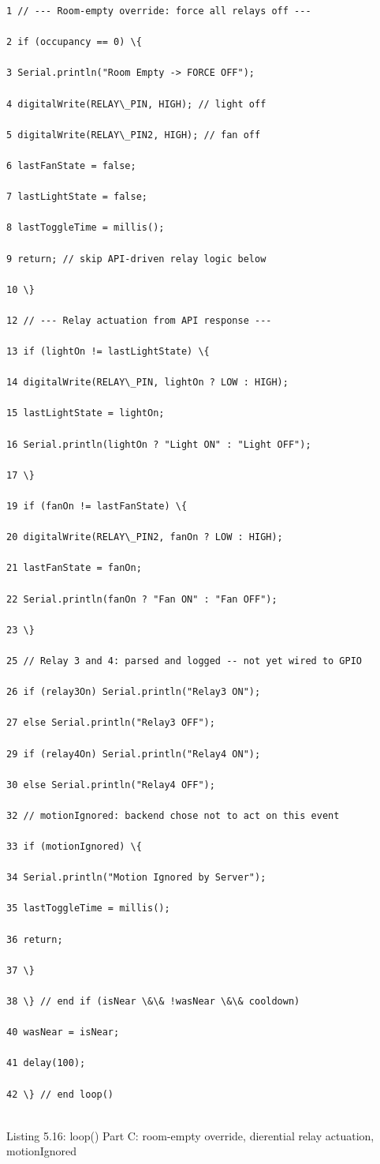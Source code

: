 \begin{listingbox}
	\begin{verbatim}
1 // --- Room-empty override: force all relays off ---

2 if (occupancy == 0) \{

3 Serial.println("Room Empty -> FORCE OFF");

4 digitalWrite(RELAY\_PIN, HIGH); // light off

5 digitalWrite(RELAY\_PIN2, HIGH); // fan off

6 lastFanState = false;

7 lastLightState = false;

8 lastToggleTime = millis();

9 return; // skip API-driven relay logic below

10 \}

12 // --- Relay actuation from API response ---

13 if (lightOn != lastLightState) \{

14 digitalWrite(RELAY\_PIN, lightOn ? LOW : HIGH);

15 lastLightState = lightOn;

16 Serial.println(lightOn ? "Light ON" : "Light OFF");

17 \}

19 if (fanOn != lastFanState) \{

20 digitalWrite(RELAY\_PIN2, fanOn ? LOW : HIGH);

21 lastFanState = fanOn;

22 Serial.println(fanOn ? "Fan ON" : "Fan OFF");

23 \}

25 // Relay 3 and 4: parsed and logged -- not yet wired to GPIO

26 if (relay3On) Serial.println("Relay3 ON");

27 else Serial.println("Relay3 OFF");

29 if (relay4On) Serial.println("Relay4 ON");

30 else Serial.println("Relay4 OFF");

32 // motionIgnored: backend chose not to act on this event

33 if (motionIgnored) \{

34 Serial.println("Motion Ignored by Server");

35 lastToggleTime = millis();

36 return;

37 \}

38 \} // end if (isNear \&\& !wasNear \&\& cooldown)

40 wasNear = isNear;

41 delay(100);

42 \} // end loop()


\end{verbatim}
\end{listingbox}
Listing 5.16: loop() Part C: room-empty override, dierential relay actuation, motionIgnored

